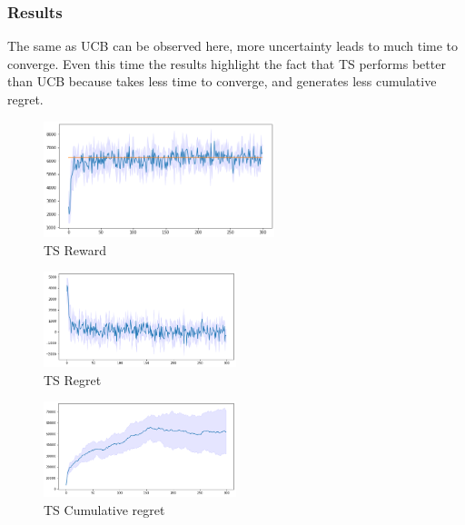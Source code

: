 \subsubsection{Results}
The same as UCB can be observed here, more uncertainty leads to much time to converge. Even this time the results highlight the fact that TS performs better than UCB because takes less time to converge, and generates less cumulative regret.
\begin{figure}[ht]
    \begin{center}
    \includegraphics[width=0.6\textwidth]{img/TS4.png}
    \caption{TS Reward}
    \label{fig:reward42}
    \end{center}
\end{figure}
\begin{multicols}{2}
    \begin{figure}[H]
        \begin{center}
        \includegraphics[width=0.5\textwidth]{img/TS4_regret.png}
        \caption{TS Regret}
        \label{fig:regret42}
        \end{center}
    \end{figure}
    \columnbreak
    \begin{figure}[H]
        \begin{center}
        \includegraphics[width=0.5\textwidth]{img/TS4_cum_reg.png}
        \caption{TS Cumulative regret}
        \label{fig:cum_reg42}
        \end{center}
    \end{figure}
\end{multicols}
